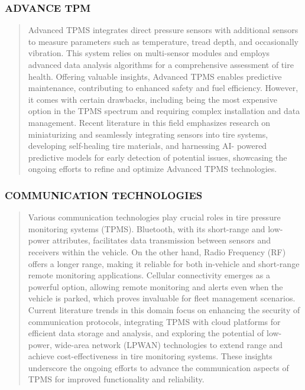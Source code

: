 \documentclass[
]{article}
\begin{document}
\newpage
\hypertarget{advance-tpm}{%
\subsubsection{ADVANCE TPM}\label{advance-tpm}}

\begin{quote}
Advanced TPMS integrates direct pressure sensors with additional sensors
to measure parameters such as temperature, tread depth, and occasionally
vibration. This system relies on multi-sensor modules and employs
advanced data analysis algorithms for a comprehensive assessment of tire
health. Offering valuable insights, Advanced TPMS enables predictive
maintenance, contributing to enhanced safety and fuel efficiency.
However, it comes with certain drawbacks, including being the most
expensive option in the TPMS spectrum and requiring complex installation
and data management. Recent literature in this field emphasizes research
on miniaturizing and seamlessly integrating sensors into tire systems,
developing self-healing tire materials, and harnessing AI- powered
predictive models for early detection of potential issues, showcasing
the ongoing efforts to refine and optimize Advanced TPMS technologies.
\end{quote}

\hypertarget{communication-technologies}{%
\subsubsection{COMMUNICATION
TECHNOLOGIES}\label{communication-technologies}}

\begin{quote}
Various communication technologies play crucial roles in tire pressure
monitoring systems (TPMS). Bluetooth, with its short-range and low-power
attributes, facilitates data transmission between sensors and receivers
within the vehicle. On the other hand, Radio Frequency (RF) offers a
longer range, making it reliable for both in-vehicle and short-range
remote monitoring applications. Cellular connectivity emerges as a
powerful option, allowing remote monitoring and alerts even when the
vehicle is parked, which proves invaluable for fleet management
scenarios. Current literature trends in this domain focus on enhancing
the security of communication protocols, integrating TPMS with cloud
platforms for efficient data storage and analysis, and exploring the
potential of low-power, wide-area network (LPWAN) technologies to extend
range and achieve cost-effectiveness in tire monitoring systems. These
insights underscore the ongoing efforts to advance the communication
aspects of TPMS for improved functionality and reliability.
\end{quote}
\end{document}

